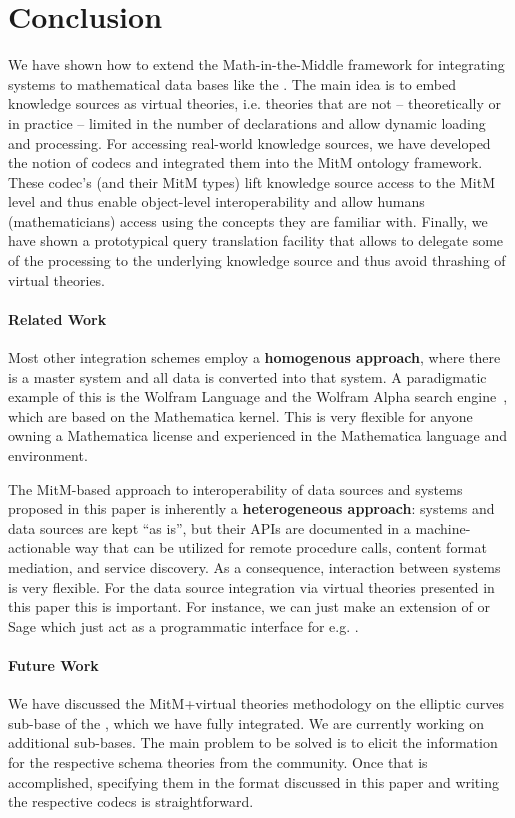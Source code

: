 \section{Conclusion}\label{sec:concl}

We have shown how to extend the Math-in-the-Middle framework for integrating systems to mathematical data bases like the \lmfdb. 
The main idea is to embed knowledge sources as virtual theories, i.e. theories that are not -- theoretically or in practice -- limited in the number of declarations and allow dynamic loading and processing. 
For accessing real-world knowledge sources, we have developed the notion of codecs and integrated them into the MitM ontology framework. 
These codec's (and their MitM types) lift knowledge source access to the MitM level and thus enable object-level interoperability and allow humans (mathematicians) access using the concepts they are familiar with. 
Finally, we have shown a prototypical query translation facility that allows to delegate some of the processing to the underlying knowledge source and thus avoid thrashing of virtual theories. 

\paragraph{Related Work} Most other integration schemes employ a \textbf{homogenous approach}, where there is a master system and all data is converted into that system. 
A paradigmatic example of this is the Wolfram Language and the Wolfram Alpha search engine~\cite{WolframAlpha:on}, which are based on the Mathematica kernel. 
This is very flexible for anyone owning a Mathematica license and experienced in the Mathematica language and environment.

The MitM-based approach to interoperability of data sources and systems proposed in this paper is inherently a \textbf{heterogeneous approach}: systems and data sources are kept ``as is'', but their APIs are documented in a machine-actionable way that can be utilized for remote procedure calls, content format mediation, and service discovery. 
As a consequence, interaction between systems is very flexible.
For the data source integration via virtual theories presented in this paper this is important. 
For instance, we can just make an extension of \mmt or Sage which just act as a programmatic interface for e.g. \lmfdb. 

\paragraph{Future Work}
We have discussed the MitM+virtual theories methodology on the elliptic curves sub-base of the \lmfdb, which we have fully integrated. 
We are currently working on additional \lmfdb sub-bases. 
The main problem to be solved is to elicit the information for the respective schema theories from the \lmfdb community. 
Once that is accomplished, specifying them in the format discussed in this paper and writing the respective codecs is straightforward. 


